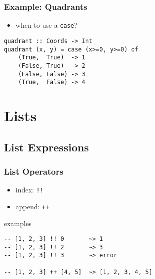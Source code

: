 \documentclass[dvipsnames]{beamer}
\theoremstyle{plain}
\begin{document}
\begin{frame}[fragile]
  \frametitle{Example: Quadrants}

  \begin{itemize}
    \item when to use a \lstinline|case|?
  \end{itemize}

  \begin{lstlisting}
quadrant :: Coords -> Int
quadrant (x, y) = case (x>=0, y>=0) of
    (True,  True)  -> 1
    (False, True)  -> 2
    (False, False) -> 3
    (True,  False) -> 4
  \end{lstlisting}
\end{frame}
% 
% 
% 
% 

\section{Lists}

\subsection{List Expressions}

\begin{frame}[fragile]
  \frametitle{List Operators}

  \begin{itemize}
    \item index: \lstinline|!!|
    \item append: \lstinline|++|
  \end{itemize}

  \pause
  \begin{exampleblock}{examples}
    \begin{lstlisting}
-- [1, 2, 3] !! 0       ~> 1
-- [1, 2, 3] !! 2       ~> 3
-- [1, 2, 3] !! 3       ~> error

-- [1, 2, 3] ++ [4, 5]  ~> [1, 2, 3, 4, 5]
    \end{lstlisting}
  \end{exampleblock}
\end{frame}
\end{document}
